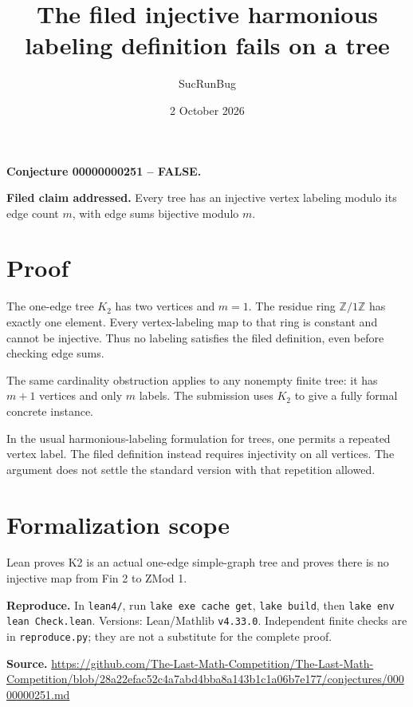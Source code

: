 \documentclass[11pt]{article}
\title{The filed injective harmonious labeling definition fails on a tree}
\author{SucRunBug}
\date{2 October 2026}
\begin{document}
\maketitle
\textbf{Conjecture 00000000251 -- FALSE.}

\textbf{Filed claim addressed.} Every tree has an injective vertex labeling modulo its edge count $m$, with edge sums bijective modulo $m$.

\section*{Proof}
The one-edge tree $K_2$ has two vertices and $m=1$. The residue ring $\mathbb Z/1\mathbb Z$ has exactly one element. Every vertex-labeling map to that ring is constant and cannot be injective. Thus no labeling satisfies the filed definition, even before checking edge sums.

The same cardinality obstruction applies to any nonempty finite tree: it has $m+1$ vertices and only $m$ labels. The submission uses $K_2$ to give a fully formal concrete instance.

In the usual harmonious-labeling formulation for trees, one permits a repeated vertex label. The filed definition instead requires injectivity on all vertices. The argument does not settle the standard version with that repetition allowed.

\section*{Formalization scope}
Lean proves K2 is an actual one-edge simple-graph tree and proves there is no injective map from Fin 2 to ZMod 1.

\textbf{Reproduce.} In \texttt{lean4/}, run \texttt{lake exe cache get},
\texttt{lake build}, then \texttt{lake env lean Check.lean}. Versions:
Lean/Mathlib \texttt{v4.33.0}. Independent finite checks are in
\texttt{reproduce.py}; they are not a substitute for the complete proof.

\textbf{Source.} \url{https://github.com/The-Last-Math-Competition/The-Last-Math-Competition/blob/28a22efac52c4a7abd4bba8a143b1c1a06b7e177/conjectures/00000000251.md}
\end{document}
